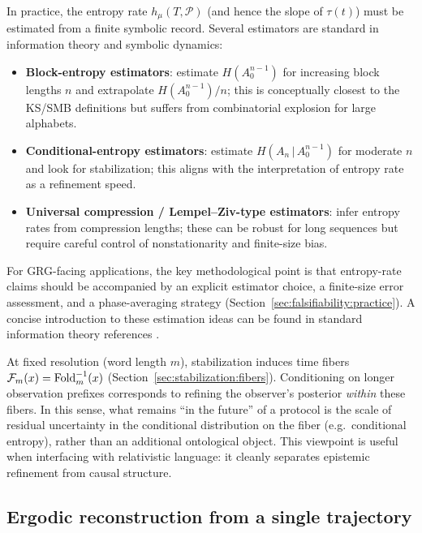 In practice, the entropy rate $h_\mu(T,\mathcal{P})$ (and hence the slope of $\tau(t)$) must be estimated from a finite symbolic record. Several estimators are standard in information theory and symbolic dynamics:
\begin{itemize}[leftmargin=*,itemsep=2pt]
  \item \textbf{Block-entropy estimators}: estimate $H(A_0^{n-1})$ for increasing block lengths $n$ and extrapolate $H(A_0^{n-1})/n$; this is conceptually closest to the KS/SMB definitions but suffers from combinatorial explosion for large alphabets.
  \item \textbf{Conditional-entropy estimators}: estimate $H(A_n\,|\,A_0^{n-1})$ for moderate $n$ and look for stabilization; this aligns with the interpretation of entropy rate as a refinement speed.
  \item \textbf{Universal compression / Lempel--Ziv-type estimators}: infer entropy rates from compression lengths; these can be robust for long sequences but require careful control of nonstationarity and finite-size bias.
\end{itemize}
For GRG-facing applications, the key methodological point is that entropy-rate claims should be accompanied by an explicit estimator choice, a finite-size error assessment, and a phase-averaging strategy (Section~\ref{sec:falsifiability:practice}). A concise introduction to these estimation ideas can be found in standard information theory references \cite{CoverThomas2006}.

\begin{remark}\label{rem:future}
At fixed resolution (word length $m$), stabilization induces time fibers $\mathcal{F}_m(x)=\mathrm{Fold}_m^{-1}(x)$ (Section~\ref{sec:stabilization:fibers}). Conditioning on longer observation prefixes corresponds to refining the observer's posterior \emph{within} these fibers. In this sense, what remains ``in the future'' of a protocol is the scale of residual uncertainty in the conditional distribution on the fiber (e.g.\ conditional entropy), rather than an additional ontological object. This viewpoint is useful when interfacing with relativistic language: it cleanly separates epistemic refinement from causal structure.
\end{remark}

\subsection{Ergodic reconstruction from a single trajectory}\label{sec:info-time:holography}

